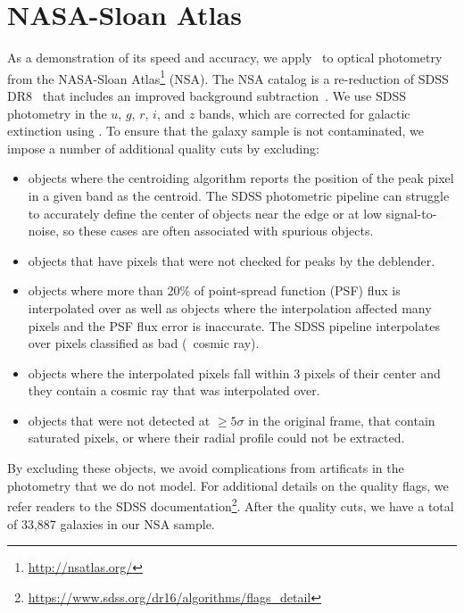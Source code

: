 \section{NASA-Sloan Atlas} \label{sec:obs}
As a demonstration of its speed and accuracy, we apply \sedflow~to optical
photometry from the NASA-Sloan Atlas\footnote{\url{http://nsatlas.org/}} (NSA).
The NSA catalog is a re-reduction of SDSS DR8~\citep{aihara2011} that includes
an improved background subtraction~\citep{blanton2011}.
We use SDSS photometry in the $u$, $g$, $r$, $i$, and $z$ bands, which are
corrected for galactic extinction using \cite{schlegel1998}.
To ensure that the galaxy sample is not contaminated, we impose a number of
additional quality cuts by excluding:
\begin{itemize}
    \item objects where the centroiding algorithm reports the
    position of the peak pixel in a given band as the centroid. 
    The SDSS photometric pipeline can struggle to accurately define the center
    of objects near the edge or at low signal-to-noise, so these cases are
    often associated with spurious objects. 
    \item objects that have pixels that were not checked for peaks by the
    deblender. 
    \item objects where more than 20\% of point-spread function (PSF) flux is
    interpolated over as well as objects where the interpolation affected many
    pixels and the PSF flux error is inaccurate. 
    The SDSS pipeline interpolates over pixels classified as bad (\eg~cosmic
    ray).
    \item objects where the interpolated pixels fall within 3 pixels of their
    center and they contain a cosmic ray that was interpolated over.
    \item objects that were not detected at $\ge5\sigma$ in the original frame,
    that contain saturated pixels, or where their radial profile could not be
    extracted.
\end{itemize}
By excluding these objects, we avoid complications from artificats in the
photometry that we do not model. 
For additional details on the quality flags, we refer readers to the SDSS
documentation\footnote{\url{https://www.sdss.org/dr16/algorithms/flags_detail}}.
After the quality cuts, we have a total of 33,887 galaxies in our NSA sample.

